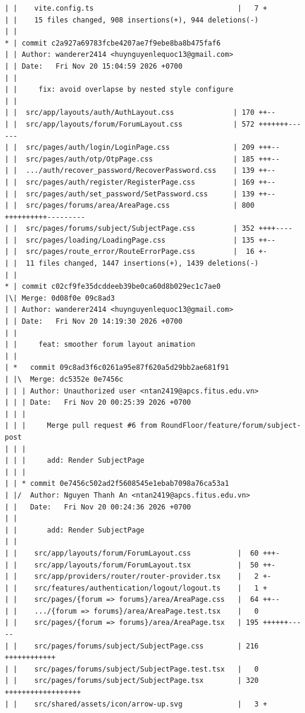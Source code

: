 \documentclass[12pt]{article}
\begin{document}
\begin{lstlisting}[numbers=none,breaklines=true]
| |    vite.config.ts                                  |   7 +
| |    15 files changed, 908 insertions(+), 944 deletions(-)
| |
* | commit c2a927a69783fcbe4207ae7f9ebe8ba8b475faf6
| | Author: wanderer2414 <huynguyenlequoc13@gmail.com>
| | Date:   Fri Nov 20 15:04:59 2026 +0700
| |
| |     fix: avoid overlapse by nested style configure
| |
| |  src/app/layouts/auth/AuthLayout.css              | 170 ++--
| |  src/app/layouts/forum/ForumLayout.css            | 572 +++++++------
| |  src/pages/auth/login/LoginPage.css               | 209 +++--
| |  src/pages/auth/otp/OtpPage.css                   | 185 +++--
| |  .../auth/recover_password/RecoverPassword.css    | 139 ++--
| |  src/pages/auth/register/RegisterPage.css         | 169 ++--
| |  src/pages/auth/set_password/SetPassword.css      | 139 ++--
| |  src/pages/forums/area/AreaPage.css               | 800 ++++++++++---------
| |  src/pages/forums/subject/SubjectPage.css         | 352 ++++----
| |  src/pages/loading/LoadingPage.css                | 135 ++--
| |  src/pages/route_error/RouteErrorPage.css         |  16 +-
| |  11 files changed, 1447 insertions(+), 1439 deletions(-)
| |
* | commit c02cf9fe35dcddeeb39be0ca60d8b029ec1c7ae0
|\| Merge: 0d08f0e 09c8ad3
| | Author: wanderer2414 <huynguyenlequoc13@gmail.com>
| | Date:   Fri Nov 20 14:19:30 2026 +0700
| |
| |     feat: smoother forum layout animation
| |
| *   commit 09c8ad3f6c0261a95e87f620a5d29bb2ae681f91
| |\  Merge: dc5352e 0e7456c
| | | Author: Unauthorized user <ntan2419@apcs.fitus.edu.vn>
| | | Date:   Fri Nov 20 00:25:39 2026 +0700
| | |
| | |     Merge pull request #6 from RoundFloor/feature/forum/subject-post
| | |
| | |     add: Render SubjectPage
| | |
| | * commit 0e7456c502ad2f5608545e1ebab7098a76ca53a1
| |/  Author: Nguyen Thanh An <ntan2419@apcs.fitus.edu.vn>
| |   Date:   Fri Nov 20 00:24:36 2026 +0700
| |
| |       add: Render SubjectPage
| |
| |    src/app/layouts/forum/ForumLayout.css           |  60 +++-
| |    src/app/layouts/forum/ForumLayout.tsx           |  50 ++-
| |    src/app/providers/router/router-provider.tsx    |   2 +-
| |    src/features/authentication/logout/logout.ts    |   1 +
| |    src/pages/{forum => forums}/area/AreaPage.css   |  64 ++--
| |    .../{forum => forums}/area/AreaPage.test.tsx    |   0
| |    src/pages/{forum => forums}/area/AreaPage.tsx   | 195 ++++++-----
| |    src/pages/forums/subject/SubjectPage.css        | 216 ++++++++++++
| |    src/pages/forums/subject/SubjectPage.test.tsx   |   0
| |    src/pages/forums/subject/SubjectPage.tsx        | 320 ++++++++++++++++++
| |    src/shared/assets/icon/arrow-up.svg             |   3 +

\end{lstlisting}
\end{document}
